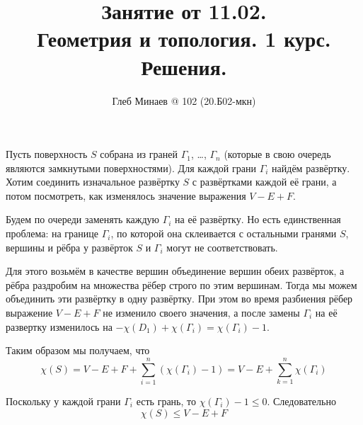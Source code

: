 \documentclass[12pt,a4paper]{article}
\title{Занятие от 11.02.\\Геометрия и топология. 1 курс.\\Решения.}
\author{Глеб Минаев @ 102 (20.Б02-мкн)}
\begin{document}
    \maketitle

    \begin{problem}{73} 
        Пусть поверхность $S$ собрана из граней $\Gamma_1$, \dots, $\Gamma_n$ (которые в свою очередь являются замкнутыми поверхностями). Для каждой грани $\Gamma_i$ найдём развёртку. Хотим соединить изначальное развёртку $S$ с развёртками каждой её грани, а потом посмотреть, как изменялось значение выражения $V - E + F$.

        Будем по очереди заменять каждую $\Gamma_i$ на её развёртку. Но есть единственная проблема: на границе $\Gamma_i$, по которой она склеивается с остальными гранями $S$, вершины и рёбра у развёрток $S$ и $\Gamma_i$ могут не соответствовать.
        \begin{figure}[h]
            \centering
        \end{figure}
        Для этого возьмём в качестве вершин объединение вершин обеих развёрток, а рёбра раздробим на множества рёбер строго по этим вершинам. Тогда мы можем объединить эти развёртку в одну развёртку. При этом во время разбиения рёбер выражение $V - E + F$ не изменило своего значения, а после замены $\Gamma_i$ на её развертку изменилось на $- \chi(D_1) + \chi(\Gamma_i) = \chi(\Gamma_i) - 1$.

        Таким образом мы получаем, что
        \[\chi(S) = V - E + F + \sum_{i=1}^n (\chi(\Gamma_i) - 1) = V - E + \sum_{k=1}^n \chi(\Gamma_i)\]

        Поскольку у каждой грани $\Gamma_i$ есть грань, то $\chi(\Gamma_i) - 1 \leqslant 0$. Следовательно
        \[\chi(S) \leqslant V - E + F\]
    \end{problem}
\end{document}
